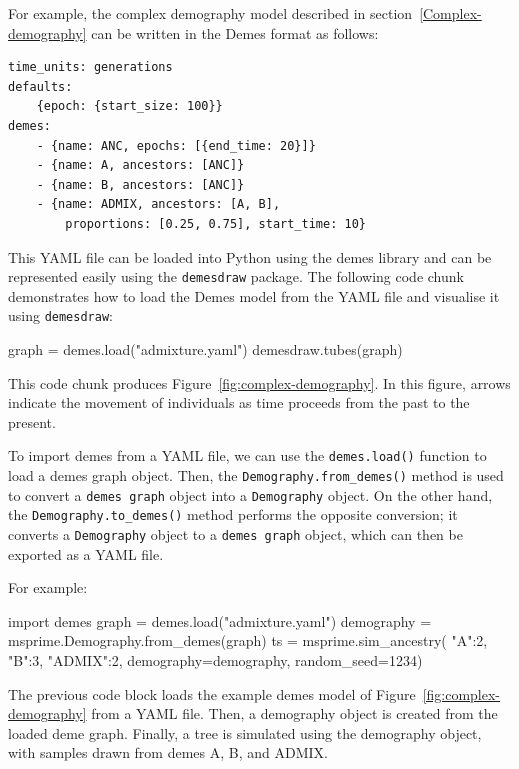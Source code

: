 \documentclass[graybox]{svmult}
\begin{document}
For example, the complex demography model described in section~\ref{Complex-demography} can be
written in the Demes format as follows:

\begin{footnotesize}
\begin{verbatim}
time_units: generations
defaults:
    {epoch: {start_size: 100}}
demes:
    - {name: ANC, epochs: [{end_time: 20}]}
    - {name: A, ancestors: [ANC]}
    - {name: B, ancestors: [ANC]}
    - {name: ADMIX, ancestors: [A, B],
        proportions: [0.25, 0.75], start_time: 10}
\end{verbatim}
\end{footnotesize}

This YAML file can be loaded into Python using the demes library and can be represented
easily using the \texttt{demesdraw} package. The following code chunk demonstrates how to
load the Demes model from the YAML file and visualise it using \texttt{demesdraw}:

\begin{pythoncode}
graph = demes.load("admixture.yaml")
demesdraw.tubes(graph)
\end{pythoncode}

This code chunk produces Figure~\ref{fig:complex-demography}. In this figure, arrows indicate
the movement of individuals as time proceeds from the past to the present.


To import demes from a YAML file, we can use the \texttt{demes.load()} function to
load a demes graph object. Then, the \texttt{Demography.from\_demes()} method is used to convert a
\texttt{demes graph} object into a \texttt{Demography} object. On the
other hand, the \texttt{Demography.to\_demes()} method performs the opposite conversion; it
converts a \texttt{Demography} object to a \texttt{demes graph} object, which can then be
exported as a YAML file.

For example:

\begin{pythoncode}
import demes
graph = demes.load("admixture.yaml")
demography = msprime.Demography.from_demes(graph)
ts = msprime.sim_ancestry(
    {"A":2, "B":3, "ADMIX":2},
    demography=demography, random_seed=1234)
\end{pythoncode}

The previous code block loads the example demes model of Figure~\ref{fig:complex-demography} from a YAML file. Then, a demography
object is created from the loaded deme graph. Finally, a tree is simulated using the demography object, with samples
drawn from demes A, B, and ADMIX.
\end{document}
